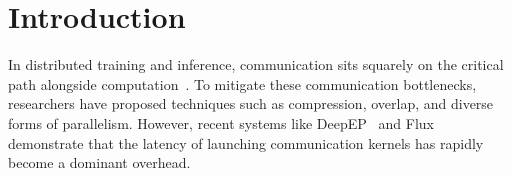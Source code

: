 


\vspace{-8pt}
\section{Introduction}
\vspace{-8pt}

In distributed training and inference, communication sits squarely on the critical path alongside computation~\cite{megatron-lm, nanoflow}. To mitigate these communication bottlenecks, researchers have proposed techniques such as compression, overlap, and diverse forms of parallelism. However, recent systems like DeepEP~\cite{deepep2025} and Flux~\cite{chang2024flux} demonstrate that the latency of launching communication kernels has rapidly become a dominant overhead.

